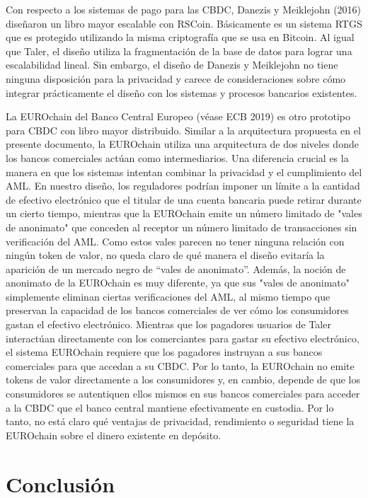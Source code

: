 \documentclass[10pt,spanish]{article}
\begin{document}
Con respecto a los sistemas de pago para las CBDC, Danezis y Meiklejohn
(2016) diseñaron un libro mayor escalable con RSCoin. Básicamente es un
sistema RTGS que es protegido utilizando la misma criptografía que se
usa en Bitcoin. Al igual que Taler, el diseño utiliza la fragmentación
de la base de datos para lograr una escalabilidad lineal. Sin embargo,
el diseño de Danezis y Meiklejohn no tiene ninguna disposición para la
privacidad y carece de consideraciones sobre cómo integrar prácticamente
el diseño con los sistemas y procesos bancarios existentes.

La EUROchain del Banco Central Europeo (véase ECB 2019) es otro
prototipo para CBDC con libro mayor distribuido. Similar a la
arquitectura propuesta en el presente documento, la EUROchain utiliza
una arquitectura de dos niveles donde los bancos comerciales actúan como
intermediarios. Una diferencia crucial es la manera en que los sistemas
intentan combinar la privacidad y el cumplimiento del AML. En nuestro
diseño, los reguladores podrían imponer un límite a la cantidad de
efectivo electrónico que el titular de una cuenta bancaria puede retirar
durante un cierto tiempo, mientras que la EUROchain emite un número
limitado de "vales de anonimato" que conceden al receptor un número
limitado de transacciones sin verificación del AML. Como estos vales
parecen no tener ninguna relación con ningún token de valor, no queda
claro de qué manera el diseño evitaría la aparición de un mercado negro
de ``vales de anonimato''. Además, la noción de anonimato de la
EUROchain es muy diferente, ya que sus "vales de anonimato" simplemente
eliminan ciertas verificaciones del AML, al mismo tiempo que preservan
la capacidad de los bancos comerciales de ver cómo los consumidores
gastan el efectivo electrónico. Mientras que los pagadores usuarios de
Taler interactúan directamente con los comerciantes para gastar su
efectivo electrónico, el sistema EUROchain requiere que los pagadores
instruyan a sus bancos comerciales para que accedan a su CBDC. Por lo
tanto, la EUROchain no emite tokens de valor directamente a los
consumidores y, en cambio, depende de que los consumidores se
autentiquen ellos mismos en sus bancos comerciales para acceder a la
CBDC que el banco central mantiene efectivamente en custodia. Por lo
tanto, no está claro qué ventajas de privacidad, rendimiento o seguridad
tiene la EUROchain sobre el dinero existente en depósito.

\hypertarget{conclusiuxf3n}{%
\section{Conclusión}
\label{7.-conclusiuxf3n}}
\end{document}
